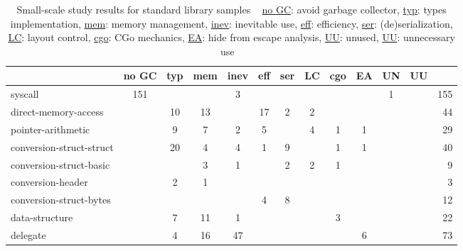 \begin{table}[h]
    \caption[Small-scale study results for standard library samples]%
        {Small-scale study results for standard library samples \newline \tiny ~ \newline \small
            \underline{no GC}: avoid garbage collector, \underline{typ}: types implementation,
            \underline{mem}: memory management, \underline{inev}: inevitable use, \underline{eff}: efficiency,
            \underline{ser}: (de)serialization, \underline{LC}: layout control, \underline{cgo}: CGo mechanics,
            \underline{EA}: hide from escape analysis, \underline{UU}: unused, \underline{UU}: unnecessary use \newline \tiny ~}
    \label{tbl:survey-small-results-std}
    \begin{tabularx}{\textwidth}{Xccccccccccc|r}
        \toprule
                                          & no GC & typ & mem & inev & eff & ser & LC & cgo & EA & UN & UU &   {} \\
        \midrule
                                  syscall &   151 &     &     &    3 &     &     &    &     &    &  1 &    &  155 \\
        \rowcolor{verylightgray}
                     direct-memory-access &       &  10 &  13 &      &  17 &   2 &  2 &     &    &    &    &   44 \\
                       pointer-arithmetic &       &   9 &   7 &    2 &   5 &     &  4 &   1 &  1 &    &    &   29 \\
        \rowcolor{verylightgray}
                 conversion-struct-struct &       &  20 &   4 &    4 &   1 &   9 &    &   1 &  1 &    &    &   40 \\
                  conversion-struct-basic &       &     &   3 &    1 &     &   2 &  2 &   1 &    &    &    &    9 \\
        \rowcolor{verylightgray}
                        conversion-header &       &   2 &   1 &      &     &     &    &     &    &    &    &    3 \\
                  conversion-struct-bytes &       &     &     &      &   4 &   8 &    &     &    &    &    &   12 \\
        \rowcolor{verylightgray}
                           data-structure &       &   7 &  11 &    1 &     &     &    &   3 &    &    &    &   22 \\
                                 delegate &       &   4 &  16 &   47 &     &     &    &     &  6 &    &    &   73 \\

\end{tabularx}
\end{table}
